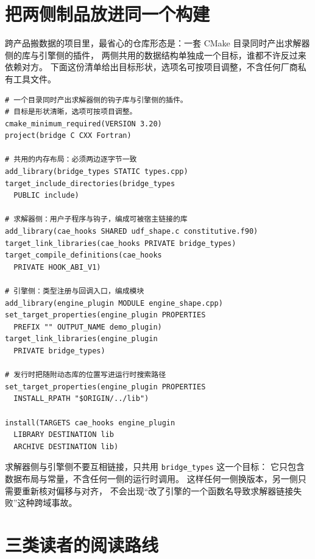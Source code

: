 \documentclass[12pt,a4paper,fontset=fandol]{ctexbook}
\newcommand{\Tp}[1]{\texttt{#1}}
\begin{document}
\section{把两侧制品放进同一个构建}

跨产品搬数据的项目里，最省心的仓库形态是：一套 CMake 目录同时产出求解器侧的库与引擎侧的插件，
两侧共用的数据结构单独成一个目标，谁都不许反过来依赖对方。
下面这份清单给出目标形状，选项名可按项目调整，不含任何厂商私有工具文件。

\begin{lstlisting}[style=cmakestyle, caption={两侧制品共存的最小目标结构：求解器侧库、引擎侧插件与共用类型}, label={lst:apC-build}]
# 一个目录同时产出求解器侧的钩子库与引擎侧的插件。
# 目标是形状清晰，选项可按项目调整。
cmake_minimum_required(VERSION 3.20)
project(bridge C CXX Fortran)

# 共用的内存布局：必须两边逐字节一致
add_library(bridge_types STATIC types.cpp)
target_include_directories(bridge_types
  PUBLIC include)

# 求解器侧：用户子程序与钩子，编成可被宿主链接的库
add_library(cae_hooks SHARED udf_shape.c constitutive.f90)
target_link_libraries(cae_hooks PRIVATE bridge_types)
target_compile_definitions(cae_hooks
  PRIVATE HOOK_ABI_V1)

# 引擎侧：类型注册与回调入口，编成模块
add_library(engine_plugin MODULE engine_shape.cpp)
set_target_properties(engine_plugin PROPERTIES
  PREFIX "" OUTPUT_NAME demo_plugin)
target_link_libraries(engine_plugin
  PRIVATE bridge_types)

# 发行时把随附动态库的位置写进运行时搜索路径
set_target_properties(engine_plugin PROPERTIES
  INSTALL_RPATH "$ORIGIN/../lib")

install(TARGETS cae_hooks engine_plugin
  LIBRARY DESTINATION lib
  ARCHIVE DESTINATION lib)
\end{lstlisting}

\begin{bestpractice}[title={共用类型是唯一的双向耦合点}]
求解器侧与引擎侧不要互相链接，只共用 \Tp{bridge\_types} 这一个目标：
它只包含数据布局与常量，不含任何一侧的运行时调用。
这样任何一侧换版本，另一侧只需要重新核对偏移与对齐，
不会出现``改了引擎的一个函数名导致求解器链接失败''这种跨域事故。
\end{bestpractice}

\section{三类读者的阅读路线}
\end{document}

